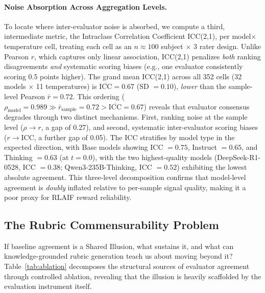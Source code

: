 \documentclass{article}
\begin{document}
\paragraph{Noise Absorption Across Aggregation Levels.} To locate where inter-evaluator noise is absorbed, we compute a third, intermediate metric, the Intraclass Correlation Coefficient ICC(2,1), per model$\times$temperature cell, treating each cell as an $n {\approx} 100$ subject $\times$ 3 rater design. Unlike Pearson $r$, which captures only linear association, ICC(2,1) penalizes \textit{both} ranking disagreements \textit{and} systematic scoring biases (e.g., one evaluator consistently scoring 0.5 points higher). The grand mean ICC(2,1) across all 352 cells (32 models $\times$ 11 temperatures) is $\overline{\text{ICC}} = 0.67$ (SD $= 0.10$), \textit{lower} than the sample-level Pearson $\bar{r} = 0.72$. This ordering ($\rho_{\text{model}} = 0.989 \gg \bar{r}_{\text{sample}} = 0.72 > \overline{\text{ICC}} = 0.67$) reveals that evaluator consensus degrades through two distinct mechanisms. First, ranking noise at the sample level ($\rho \to r$, a gap of 0.27), and second, systematic inter-evaluator scoring biases ($r \to \text{ICC}$, a further gap of 0.05). The ICC stratifies by model type in the expected direction, with Base models showing ICC $= 0.75$, Instruct $= 0.65$, and Thinking $= 0.63$ (at $t{=}0.0$), with the two highest-quality models (DeepSeek-R1-0528, ICC $= 0.38$; Qwen3-235B-Thinking, ICC $= 0.52$) exhibiting the lowest absolute agreement. This three-level decomposition confirms that model-level agreement is \textit{doubly} inflated relative to per-sample signal quality, making it a poor proxy for RLAIF reward reliability.


\subsection{The Rubric Commensurability Problem}
\label{sec:commensurability}



If baseline agreement is a Shared Illusion, what sustains it, and what can knowledge-grounded rubric generation teach us about moving beyond it? Table~\ref{tab:ablation} decomposes the structural sources of evaluator agreement through controlled ablation, revealing that the illusion is heavily scaffolded by the evaluation instrument itself.
\end{document}
